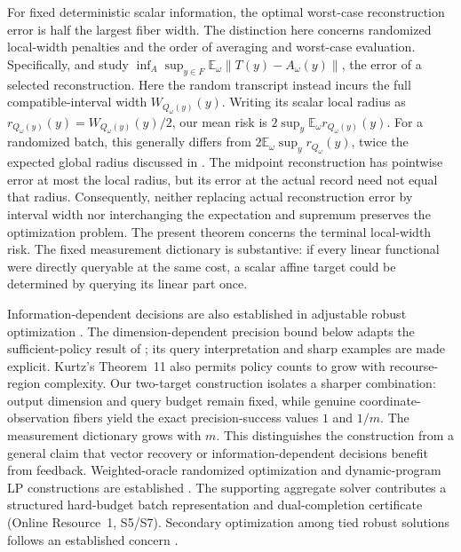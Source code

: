 \documentclass[12pt]{article}
\begin{document}
For fixed deterministic scalar information, the optimal worst-case
reconstruction error is half the largest fiber width. The distinction here
concerns randomized local-width penalties and the order of averaging and
worst-case evaluation. Specifically, \citet[Section~2]{krieg2025}
and \citet[Section~9.1, Eq.~(9.15), author manuscript v2]{krieg2026}
study $\inf_A\sup_{y\in F}\mathbb E_\omega
\lVert T(y)-A_\omega(y)\rVert$, the error of a selected reconstruction.
Here the random transcript instead incurs the full compatible-interval
width $W_{Q_\omega(y)}(y)$.
Writing its scalar local radius as $r_{Q_\omega(y)}(y)=W_{Q_\omega(y)}(y)/2$,
our mean risk is $2\sup_y\mathbb E_\omega r_{Q_\omega(y)}(y)$.
For a randomized batch, this generally differs from
$2\mathbb E_\omega\sup_y r_{Q_\omega}(y)$, twice the expected global radius
discussed in \citet[Eq.~(2.4), Remark~6.1 and Section~6.1, author manuscript v2]{krieg2026}.
The midpoint reconstruction has pointwise error at most the local radius,
but its error at the actual record need not equal that radius. Consequently,
neither replacing actual reconstruction error by interval width nor
interchanging the expectation and supremum preserves the optimization
problem. The present theorem concerns the terminal local-width risk.
The fixed measurement dictionary is substantive: if every linear
functional were directly queryable at the same cost, a scalar affine
target could be determined by querying its linear part once.


Information-dependent decisions are also established in adjustable robust
optimization \citep{wei2024,ddid}. The dimension-dependent precision
bound below adapts the sufficient-policy result of
\citet[Theorem~2 and Example~5]{kurtz2026}; its query interpretation and
sharp examples are made explicit. Kurtz's Theorem~11 also permits policy
counts to grow with recourse-region complexity. Our two-target construction
isolates a sharper combination: output dimension and query budget remain
fixed, while genuine coordinate-observation fibers yield the exact
precision-success values $1$ and $1/m$. The measurement dictionary grows
with $m$. This distinguishes the construction from a general claim that
vector recovery or information-dependent decisions benefit from feedback.
Weighted-oracle randomized optimization
and dynamic-program LP constructions are established
\citep{kawase2024,martin1990}. The supporting aggregate solver contributes
a structured hard-budget batch representation and dual-completion
certificate (Online Resource~1, S5/S7). Secondary optimization among tied
robust solutions follows an established concern \citep{iancu2014}.
\end{document}
